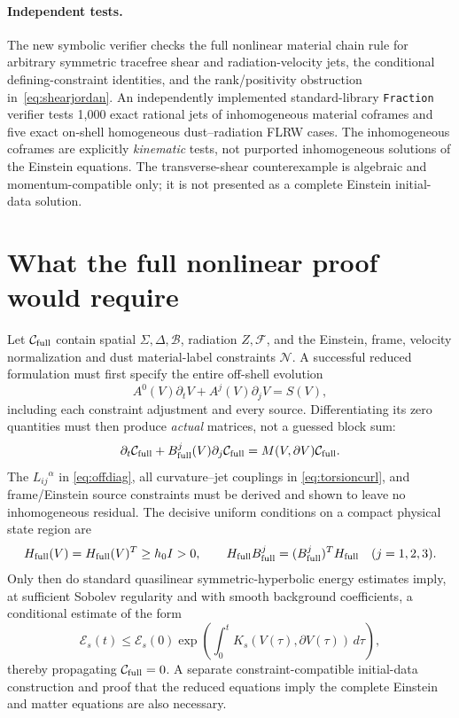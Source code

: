 \documentclass[11pt,a4paper]{article}
\newcommand{\cC}{\mathcal C}
\newcommand{\cB}{\mathcal B}
\newcommand{\cF}{\mathcal F}
\begin{document}
\paragraph{Independent tests.}
The new symbolic verifier checks the full nonlinear material chain rule for arbitrary symmetric tracefree shear and radiation-velocity jets, the conditional defining-constraint identities, and the rank/positivity obstruction in~\eqref{eq:shearjordan}. An independently implemented standard-library \texttt{Fraction} verifier tests 1,000 exact rational jets of inhomogeneous material coframes and five exact on-shell homogeneous dust--radiation FLRW cases. The inhomogeneous coframes are explicitly \emph{kinematic} tests, not purported inhomogeneous solutions of the Einstein equations. The transverse-shear counterexample is algebraic and momentum-compatible only; it is not presented as a complete Einstein initial-data solution.

\section{What the full nonlinear proof would require}
Let $\cC_{\rm full}$ contain spatial $\Sigma,\Delta,\cB$, radiation $Z,\cF$, and the Einstein, frame, velocity normalization and dust material-label constraints $\mathcal N$. A successful reduced formulation must first specify the entire off-shell evolution
\[A^0(V)\partial_tV+A^j(V)\partial_jV=S(V),\]
including each constraint adjustment and every source. Differentiating its zero quantities must then produce \emph{actual} matrices, not a guessed block sum:
\begin{equation}\label{eq:desired}
\partial_t\cC_{\rm full}+B^j_{\rm full}(V)\partial_j\cC_{\rm full}
=M(V,\partial V)\cC_{\rm full}.
\end{equation}
The $L_{ij}{}^\alpha$ in \eqref{eq:offdiag}, all curvature--jet couplings in \eqref{eq:torsioncurl}, and frame/Einstein source constraints must be derived and shown to leave no inhomogeneous residual. The decisive uniform conditions on a compact physical state region are
\begin{equation}\label{eq:gate}
H_{\rm full}(V)=H_{\rm full}(V)^T\ge h_0 I>0,\qquad
H_{\rm full}B^j_{\rm full}=(B^j_{\rm full})^TH_{\rm full}\quad(j=1,2,3).
\end{equation}
Only then do standard quasilinear symmetric-hyperbolic energy estimates imply, at sufficient Sobolev regularity and with smooth background coefficients, a conditional estimate of the form
\[\mathcal E_s(t)\le\mathcal E_s(0)\exp\left(\int_0^t K_s(V(\tau),\partial V(\tau))\,d\tau\right),\]
thereby propagating $\cC_{\rm full}=0$. A separate constraint-compatible initial-data construction and proof that the reduced equations imply the complete Einstein and matter equations are also necessary.
\end{document}

